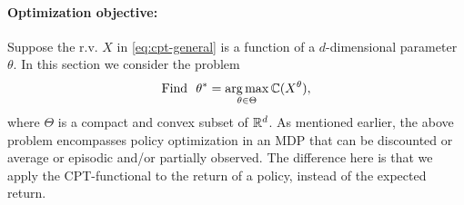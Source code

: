 \paragraph{Optimization objective:} 
Suppose the r.v. $X$ in \eqref{eq:cpt-general} is a function of a $d$-dimensional parameter $\theta$. 
In this section we consider the problem 
\begin{align}
\label{eq:opt-general}
\textrm{Find ~}\theta^* = \mathop{\rm arg\,max}_{\theta \in \Theta} \mathbb{C}(X^\theta),
\end{align}
where $\Theta$ is a compact and convex subset of $\mathbb{R}^d$. As mentioned earlier, the above problem encompasses policy optimization in an MDP that can be discounted or average or episodic and/or partially observed. The difference here is that we apply the CPT-functional to the return of a policy, instead of the expected return.  

%

